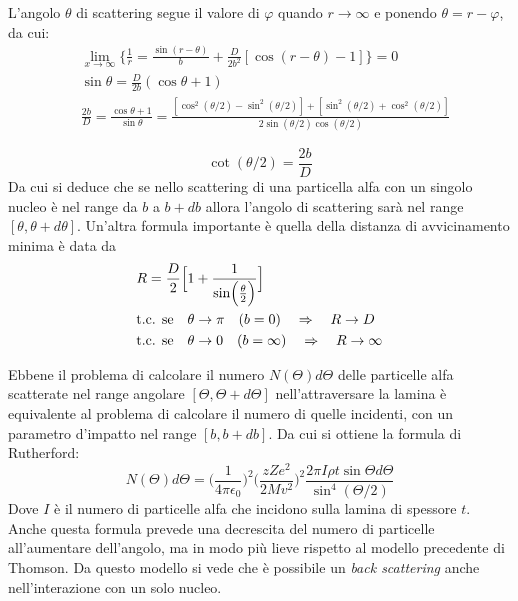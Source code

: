 L'angolo $\theta$ di scattering segue il valore di $\varphi$ quando $r \rightarrow \infty $ e ponendo $\theta = r - \varphi $, da cui:
\begin{equation}
\begin{split}
& \lim_{x\to\infty} \bigg\{  \frac{1}{r} = \frac{\sin(r - \theta)}{b} + \frac{D}{2 b^2} [ \cos (r - \theta) - 1 ] \bigg\} = 0 \\
& \sin \theta = \frac{D}{2 b} (\cos \theta + 1) \\
& \frac{2 b }{D} = \frac{\cos \theta + 1}{\sin \theta} = \frac{ [\cos^2 (\theta /2) - \sin^2 (\theta /2) ] + [ \sin^2(\theta /2) + \cos^2(\theta /2) ] }{  2 \sin(\theta /2) \cos(\theta /2)  }
\end{split}
\end{equation}

\begin{equation}
\cot(\theta /2) = \frac{2 b}{D}
\label{angolo_di_scattering}
\end{equation}
Da cui si deduce che se nello scattering di una particella alfa con un singolo nucleo è nel range da $b$ a $b + db$ allora l'angolo di scattering sarà nel range $[\theta, \theta + d\theta]$.
Un'altra formula importante è quella della distanza di avvicinamento minima è data da
\begin{equation}
\begin{split}
& R = \frac{ D}{2 } \Bigl[ 1 + \frac{ 1}{\sin\Bigl(  \frac{\theta}{2 }  \Bigr) } \Bigr] \\
& \mbox{t.c. se} \quad \theta \to \pi \quad (b=0) \quad \Rightarrow \quad R \to D \\
& \mbox{t.c. se} \quad \theta \to 0 \quad (b=\infty) \quad \Rightarrow \quad R \to \infty
\end{split}
\end{equation}

Ebbene il problema di calcolare il numero $ N(\Theta) d\Theta$ delle particelle alfa scatterate nel range angolare $[\Theta, \Theta +d\Theta]$ nell'attraversare la lamina è equivalente al problema di calcolare il numero di quelle incidenti, con un parametro d'impatto nel range $[b, b +db]$.
Da cui si ottiene la formula di Rutherford:
\begin{equation}
N(\Theta)d\Theta = \biggl( \frac{1}{4\pi \epsilon_0} \biggr) ^2  \biggl( \frac{z Z e^2}{2 M v^2} \biggr)^2  \frac{ 2 \pi I \rho t  \sin\Theta d\Theta }{ \sin^4(\Theta/2) }
\label{scattering_rutherford}
\end{equation}
Dove $I$ è il numero di particelle alfa che incidono sulla lamina di spessore $t$.
Anche questa formula prevede una decrescita del numero di particelle all'aumentare dell'angolo, ma in modo più lieve rispetto al modello precedente di Thomson.
Da questo modello si vede che è possibile un \textit{back scattering} anche nell'interazione con un solo nucleo.

